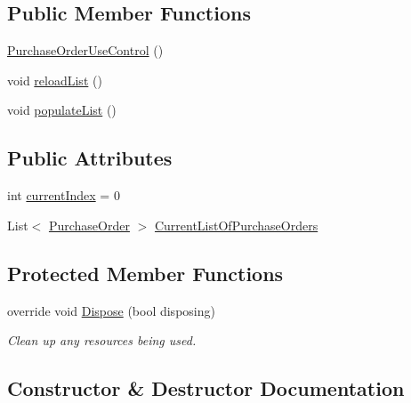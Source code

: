 \subsection*{Public Member Functions}
\begin{DoxyCompactItemize}
\item 
\hyperlink{class_health___assignment_1_1_purchase_order_use_control_abcf42ddfb611d75e561b590230954466}{Purchase\+Order\+Use\+Control} ()
\item 
void \hyperlink{class_health___assignment_1_1_purchase_order_use_control_a1448bb67fa8ff2f972a39739c11ea165}{reload\+List} ()
\item 
void \hyperlink{class_health___assignment_1_1_purchase_order_use_control_a1f72e6755f262f71aa5fd8da3efdf973}{populate\+List} ()
\end{DoxyCompactItemize}
\subsection*{Public Attributes}
\begin{DoxyCompactItemize}
\item 
int \hyperlink{class_health___assignment_1_1_purchase_order_use_control_a41609de75c5ea40f5d4f521062bfad34}{current\+Index} = 0
\item 
List$<$ \hyperlink{class_health___assignment_1_1_purchase_order}{Purchase\+Order} $>$ \hyperlink{class_health___assignment_1_1_purchase_order_use_control_a49ff72a95ae04191e583b17a3027f2a7}{Current\+List\+Of\+Purchase\+Orders}
\end{DoxyCompactItemize}
\subsection*{Protected Member Functions}
\begin{DoxyCompactItemize}
\item 
override void \hyperlink{class_health___assignment_1_1_purchase_order_use_control_a88f941eca515211f7c80b9eb705d5d4f}{Dispose} (bool disposing)
\begin{DoxyCompactList}\small\item\em Clean up any resources being used. \end{DoxyCompactList}\end{DoxyCompactItemize}


\subsection{Constructor \& Destructor Documentation}
\mbox{\label{class_health___assignment_1_1_purchase_order_use_control_abcf42ddfb611d75e561b590230954466}} 
